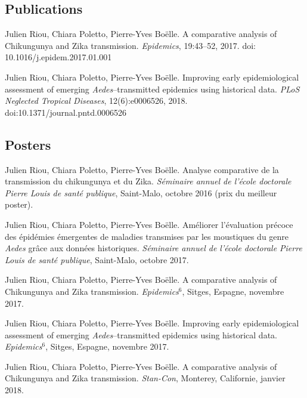 \subsection*{Publications}

\noindent Julien Riou, Chiara Poletto, Pierre-Yves Boëlle. A comparative analysis of Chikungunya and Zika transmission. {\em Epidemics}, 19:43--52, 2017. doi: 10.1016/j.epidem.2017.01.001 

\vspace{1.5em}

\noindent Julien Riou, Chiara Poletto, Pierre-Yves Boëlle. Improving early epidemiological assessment of emerging {\em Aedes}--transmitted epidemics using historical data. {\em PLoS Neglected Tropical Diseases}, 12(6):e0006526, 2018. doi:10.1371/journal.pntd.0006526


\subsection*{Posters}

\noindent Julien Riou, Chiara Poletto, Pierre-Yves Boëlle. Analyse comparative de la transmission du chikungunya et du Zika. \textit{Séminaire annuel de l'école doctorale Pierre Louis de santé publique}, Saint-Malo, octobre 2016 (prix du meilleur poster).

\vspace{1.5em}
\noindent Julien Riou, Chiara Poletto, Pierre-Yves Boëlle. Améliorer l'évaluation précoce des épidémies émergentes de maladies transmises par les moustiques du genre {\em Aedes} grâce aux données historiques. \textit{Séminaire annuel de l'école doctorale Pierre Louis de santé publique}, Saint-Malo, octobre 2017.

\vspace{1.5em}
\noindent Julien Riou, Chiara Poletto, Pierre-Yves Boëlle. A comparative analysis of Chikungunya and Zika transmission. \textit{Epidemics$^6$}, Sitges, Espagne, novembre 2017.

\vspace{1.5em}
\noindent Julien Riou, Chiara Poletto, Pierre-Yves Boëlle. Improving early epidemiological assessment of emerging {\em Aedes}--transmitted epidemics using historical data. \textit{Epidemics$^6$}, Sitges, Espagne, novembre 2017.

\vspace{1.5em}
\noindent Julien Riou, Chiara Poletto, Pierre-Yves Boëlle. A comparative analysis of Chikungunya and Zika transmission. \textit{Stan-Con}, Monterey, Californie, janvier 2018.
